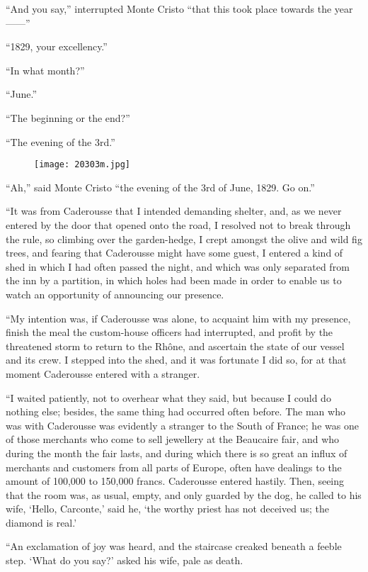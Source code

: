 “And you say,” interrupted Monte Cristo “that this took place towards
the year——”

“1829, your excellency.”

“In what month?”

“June.”

“The beginning or the end?”

“The evening of the 3rd.”

\begin{figure}[ht]
\texttt{[image: 20303m.jpg]}
\end{figure}

“Ah,” said Monte Cristo “the evening of the 3rd of June, 1829. Go on.”

“It was from Caderousse that I intended demanding shelter, and, as we
never entered by the door that opened onto the road, I resolved not to
break through the rule, so climbing over the garden-hedge, I crept
amongst the olive and wild fig trees, and fearing that Caderousse might
have some guest, I entered a kind of shed in which I had often passed
the night, and which was only separated from the inn by a partition, in
which holes had been made in order to enable us to watch an opportunity
of announcing our presence.

“My intention was, if Caderousse was alone, to acquaint him with my
presence, finish the meal the custom-house officers had interrupted,
and profit by the threatened storm to return to the Rhône, and
ascertain the state of our vessel and its crew. I stepped into the
shed, and it was fortunate I did so, for at that moment Caderousse
entered with a stranger.

“I waited patiently, not to overhear what they said, but because I
could do nothing else; besides, the same thing had occurred often
before. The man who was with Caderousse was evidently a stranger to the
South of France; he was one of those merchants who come to sell
jewellery at the Beaucaire fair, and who during the month the fair
lasts, and during which there is so great an influx of merchants and
customers from all parts of Europe, often have dealings to the amount
of 100,000 to 150,000 francs. Caderousse entered hastily. Then, seeing
that the room was, as usual, empty, and only guarded by the dog, he
called to his wife, ‘Hello, Carconte,’ said he, ‘the worthy priest has
not deceived us; the diamond is real.’

“An exclamation of joy was heard, and the staircase creaked beneath a
feeble step. ‘What do you say?’ asked his wife, pale as death.


